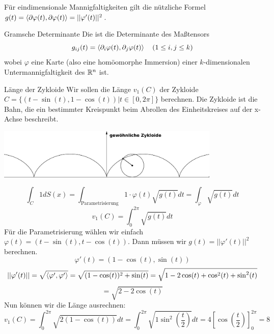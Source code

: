Für eindimensionale Mannigfaltigkeiten gilt die nützliche Formel $g(t)=\braket{\partial \varphi(t), \partial \varphi(t)}=||\varphi ' (t)||^2$.
\begin{Def}{Gramsche Determinante}
    Die  ist die Determinante des Maßtensors
    $$g_{ij}(t)=\braket{\partial_i \varphi(t), \partial_j \varphi(t)} \quad (1\leq i,j\leq k)$$
    wobei $\varphi$ eine Karte (also eine homöomorphe Immersion) einer $k$-dimensionalen Untermannigfaltigkeit des $\mathbb{R}^n$ ist. 
\end{Def}
\begin{Beispiel}{Länge der Zykloide}
    Wir sollen die Länge $v_1(C)$ der Zykloide $C=\{ (t-\sin(t), 1-\cos(t)) | t\in [0,2\pi]\}$ berechnen. Die Zykloide ist die Bahn, die ein bestimmter Kreispunkt beim Abrollen des Einheitskreises auf der x-Achse beschreibt.
   \begin{center}
    \includegraphics[width=0.8\textwidth]{Dateien/Zykloide.pdf}
\end{center}
$$\int_C 1 dS(x)=\int_{\text{Parametrisierung}} 1\cdot \varphi(t)\sqrt{g(t)}dt=\int_\varphi \sqrt{g(t)}dt$$
$$v_1(C)=\int_0^{2\pi} \sqrt{g(t)}dt$$
Für die Parametrisierung wählen wir einfach $\varphi(t)=(t-\sin(t),t-\cos(t))$. Dann müssen wir $g(t)=||\varphi'(t)||^2$ berechnen. 
$$\varphi'(t)=(1-\cos(t), \sin(t))$$
$$||\varphi'(t)||=\sqrt{\braket{\varphi ', \varphi '}}=\sqrt{(1-\cos(t))^2+\sin(t)}=\sqrt{1-2\cos(t)+\cos^2(t)+\sin^2(t)}$$
$$=\sqrt{2-2\cos(t)}$$
Nun können wir die Länge ausrechnen:
$$v_1(C)=\int_0^{2\pi} \sqrt{2(1-\cos(t))}dt=\int_0^{2\pi} \sqrt{1\sin^2(\frac{t}{2})}dt=4[\cos(\frac{t}{2})]^{2\pi}_0=8$$
\end{Beispiel}
\newpage
